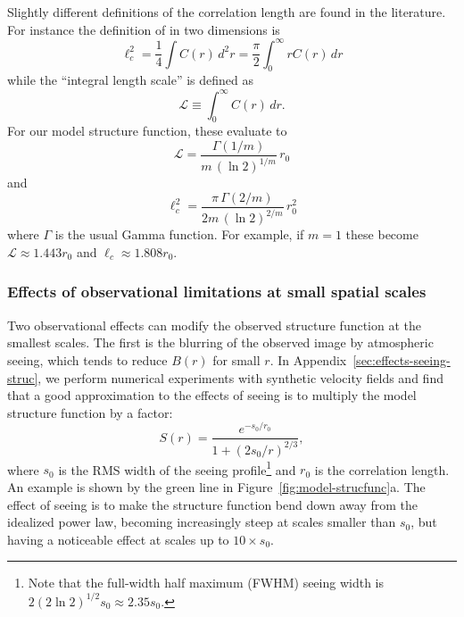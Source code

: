 \documentclass[fleqn,usenatbib, useAMS, a4paper]{mnras}
\begin{document}
\newcommand\LL{\ensuremath{\mathcal{L}}}
Slightly different definitions of the correlation length
are found in the literature.
For instance the definition of \citet{Jaupart:2022i}
in two dimensions is
\begin{equation}
  \label{eq:2}
  \ell_c^2 = \frac{1}{4} \int C(r) \, d^2 r
  = \frac{\pi}{2} \int_0^\infty r C(r) \, d r
\end{equation}
while the ``integral length scale'' \citep{Pope:2000p} is defined
as
\begin{equation}
  \label{eq:3}
  \LL \equiv \int_0^\infty C(r)\, dr .
\end{equation}
For our model structure function, these evaluate to
\begin{equation}
  \label{eq:4}
  \LL = \frac{\Gamma(1/m)}{m\, (\ln 2)^{1/m}} \, r_0
\end{equation}
and
\begin{equation}
  \label{eq:4}
   \ell_c^2 = \frac{\pi\,  \Gamma(2/m)}{2m\, (\ln 2)^{2/m}} \, r_0^2
\end{equation}
where \(\Gamma\) is the usual Gamma function.
For example, if \(m = 1\) these become \(\LL \approx 1.443 r_0\)
and \(\ell_c \approx 1.808 r_0\). 

\subsubsection{Effects of observational limitations at small spatial scales}
\label{sec:effect-observ-limit}

Two observational effects can modify the observed structure function at the smallest scales.
The first is the blurring of the observed image by atmospheric seeing,
which tends to reduce \(B(r)\) for small \(r\).
In Appendix~\ref{sec:effects-seeing-struc}, we perform numerical experiments
with synthetic velocity fields and find that
a good approximation to the effects of seeing is to multiply
the model structure function by a factor:
\begin{equation}\label{eq:ffs}
   S(r) = \frac{
    e^{-s_0 / r_0}
  }{
    1+(2s_0 / r)^{2 / 3}
  } ,
\end{equation}
where \(s_0\) is the RMS width of the seeing profile\footnote{%
  Note that the full-width half maximum (FWHM) seeing width is
  \(2 (2 \ln 2)^{1/2} s_0 \approx 2.35 s_0\).
}
and \(r_0\) is the correlation length.
An example is shown by the green line in Figure~\ref{fig:model-strucfunc}a.
The effect of seeing is to make the structure function 
bend down away from the idealized power law, 
becoming increasingly steep at scales smaller than \(s_0\),
but having a noticeable effect at scales up to \(10 \times s_0\).
\end{document}
